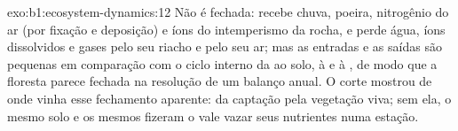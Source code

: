 \begin{solution}{exo:b1:ecosystem-dynamics:12}
Não é fechada: recebe chuva, poeira, nitrogênio do ar (por fixação e
deposição) e íons do intemperismo da rocha, e perde água, íons
dissolvidos e gases pelo seu riacho e pelo seu ar; mas as entradas e
as saídas são pequenas em comparação com o ciclo interno da
 ao solo, à  e à , de modo que a floresta parece
fechada na resolução de um balanço anual. O corte mostrou de onde vinha
esse fechamento aparente: da captação pela vegetação viva; sem ela, o
mesmo solo e os mesmos  fizeram o vale vazar seus
nutrientes numa estação.
\end{solution}

